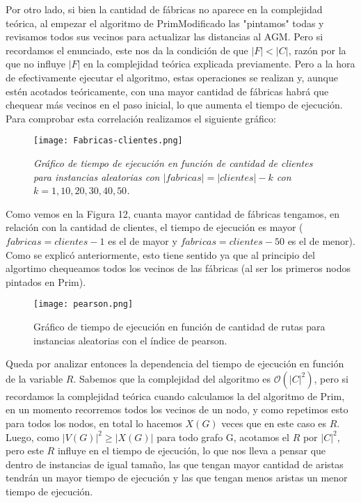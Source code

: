 \documentclass[A4paper,oneside,fleqn,11pt]{article}
\theoremstyle{definition}
\begin{document}
Por otro lado, si bien la cantidad de fábricas no aparece en la complejidad teórica, al empezar el algoritmo de PrimModificado las "pintamos" todas y revisamos todos sus vecinos para actualizar las distancias al AGM. Pero si recordamos el enunciado, este nos da la condici\'on de que  $|F|<|C|$, razón por la que no influye $|F|$ en la complejidad teórica explicada previamente. Pero a la hora de efectivamente ejecutar el algoritmo, estas operaciones se realizan y, aunque estén acotados teóricamente, con una mayor cantidad de fábricas habrá que chequear más vecinos en el paso inicial, lo que aumenta el tiempo de ejecución. Para comprobar esta correlaci\'on realizamos el siguiente gr\'afico:

\begin{wrapfigure}{R}{0.6\textwidth}
\centering
\texttt{[image: Fabricas-clientes.png]}
\caption{ \textit{Gráfico de tiempo de ejecución en función de cantidad de clientes para instancias aleatorias con $|fabricas|=|clientes|-k$ con $k=1, 10, 20, 30, 40, 50$.}}
\end{wrapfigure}

Como vemos en la Figura 12, cuanta mayor cantidad de f\'abricas tengamos, en relación con la cantidad de clientes, el tiempo de ejecución es mayor ($fabricas=clientes-1$ es el de mayor y $fabricas=clientes-50$ es el de menor). Como se explic\'o anteriormente, esto tiene sentido ya que al principio del algortimo chequeamos todos los vecinos de las fábricas (al ser los primeros nodos pintados en Prim).


 
 \begin{wrapfigure}[14]{R}{0.4\textwidth}
\centering
\texttt{[image: pearson.png]}
\caption{ Gráfico de tiempo de ejecución en función de cantidad de rutas para instancias aleatorias con el índice de pearson.}
\end{wrapfigure}
 
  
 Queda por analizar entonces la dependencia del tiempo de ejecución en funci\'on de la variable $R$. Sabemos que la complejidad del algoritmo es $\mathcal{O} (|C|^2)$, pero si recordamos la complejidad teórica cuando calculamos la del algoritmo de Prim, en un momento recorremos todos los vecinos de un nodo, y como repetimos esto para todos los nodos, en total lo hacemos $X(G)$ veces que en este caso es $R$. Luego, como $|V(G)|^2 \geq |X(G)|$ para todo grafo G, acotamos el $R$ por $|C|^2$, pero este $R$ influye en el tiempo de ejecución, lo que nos lleva a pensar que dentro de instancias de igual tamaño, las que tengan mayor cantidad de aristas tendrán un mayor tiempo de ejecución y las que tengan menos aristas un menor tiempo de ejecución.
\end{document}
